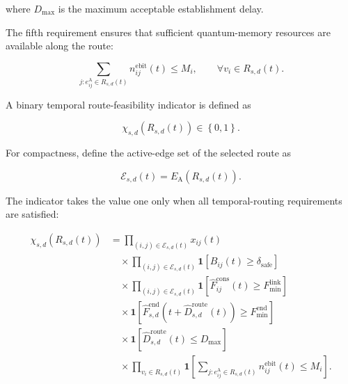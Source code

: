 where $D_{\max}$ is the maximum acceptable establishment delay.

The fifth requirement ensures that sufficient quantum-memory resources are available along the route:

\begin{equation}
    \sum_{
    j:
    e_{ij}^{\mathrm{A}}
    \in
    R_{s,d}(t)
    }
    n_{ij}^{\mathrm{ebit}}(t)
    \leq
    M_i,
    \qquad
    \forall v_i
    \in
    R_{s,d}(t).
\end{equation}

A binary temporal route-feasibility indicator is defined as

\begin{equation}
    \chi_{s,d}
    \left(
    R_{s,d}(t)
    \right)
    \in
    \left\{
    0,1
    \right\}.
\end{equation}

For compactness, define the active-edge set of the selected route as

\begin{equation}
    \mathcal{E}_{s,d}(t)
    =
    E_{\mathrm{A}}
    \left(
    R_{s,d}(t)
    \right).
\end{equation}

The indicator takes the value one only when all temporal-routing requirements are satisfied:

\begin{equation}
\begin{aligned}
    \chi_{s,d}
    \left(
    R_{s,d}(t)
    \right)
    &=
    \prod_{
    (i,j)
    \in
    \mathcal{E}_{s,d}(t)
    }
    x_{ij}(t)
    \\
    &\quad\times
    \prod_{
    (i,j)
    \in
    \mathcal{E}_{s,d}(t)
    }
    \mathbf{1}
    \left[
    B_{ij}(t)
    \geq
    \delta_{\mathrm{safe}}
    \right]
    \\
    &\quad\times
    \prod_{
    (i,j)
    \in
    \mathcal{E}_{s,d}(t)
    }
    \mathbf{1}
    \left[
    \widehat{F}_{ij}^{\mathrm{cons}}(t)
    \geq
    F_{\min}^{\mathrm{link}}
    \right]
    \\
    &\quad\times
    \mathbf{1}
    \left[
    \widehat{F}_{s,d}^{\mathrm{end}}
    \left(
    t+
    \widehat{D}_{s,d}^{\mathrm{route}}(t)
    \right)
    \geq
    F_{\min}^{\mathrm{end}}
    \right]
    \\
    &\quad\times
    \mathbf{1}
    \left[
    \widehat{D}_{s,d}^{\mathrm{route}}(t)
    \leq
    D_{\max}
    \right]
    \\
    &\quad\times
    \prod_{
    v_i
    \in
    R_{s,d}(t)
    }
    \mathbf{1}
    \left[
    \sum_{
    j:
    e_{ij}^{\mathrm{A}}
    \in
    R_{s,d}(t)
    }
    n_{ij}^{\mathrm{ebit}}(t)
    \leq
    M_i
    \right].
\end{aligned}
\end{equation}

